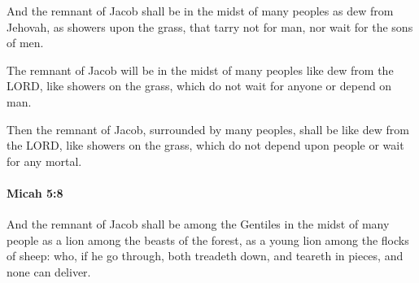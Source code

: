 			\begin{versebox}
					\item[BHS] 
					\item[LXX] 
					\item[ASV] And the remnant of Jacob shall be in the midst of many peoples as dew from Jehovah, as showers upon the grass, that tarry not for man, nor wait for the sons of men.
					\item[NIV] The remnant of Jacob will be in the midst of many peoples like dew from the LORD, like showers on the grass, which do not wait for anyone or depend on man.
					\item[NRSV] Then the remnant of Jacob, surrounded by many peoples, shall be like dew from the LORD, like showers on the grass, which do not depend upon people or wait for any mortal.
			\end{versebox}

		\paragraph{Micah 5:8} %
			\label{MICAH-5-8}

			And the remnant of Jacob shall be among the Gentiles in the midst of many people as a lion among the beasts of the forest, as a young lion among the flocks of sheep: who, if he go through, both treadeth down, and teareth in pieces, and none can deliver.

